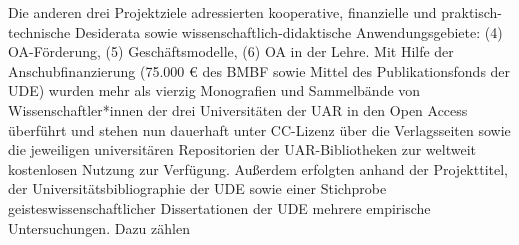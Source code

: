 \documentclass[a4paper,
fontsize=11pt,
oneside,
numbers=noperiodatend,
parskip=half-,
bibliography=totoc,
final
]{scrartcl}
\begin{document}
Die anderen drei Projektziele adressierten kooperative, finanzielle und
praktisch-technische Desiderata sowie wissenschaftlich-didaktische
Anwendungsgebiete: (4) OA-Förderung, (5) Geschäftsmodelle, (6) OA in der
Lehre. Mit Hilfe der Anschubfinanzierung (75.000 € des BMBF sowie Mittel
des Publikationsfonds der UDE) wurden mehr als vierzig Monografien und
Sammelbände von Wissenschaftler*innen der drei Universitäten der UAR in
den Open Access überführt und stehen nun dauerhaft unter CC-Lizenz über
die Verlagsseiten sowie die jeweiligen universitären Repositorien der
UAR-Bibliotheken zur weltweit kostenlosen Nutzung zur Verfügung.
Außerdem erfolgten anhand der Projekttitel, der
Universitätsbibliographie der UDE sowie einer Stichprobe
geisteswissenschaftlicher Dissertationen der UDE mehrere empirische
Untersuchungen. Dazu zählen
\end{document}
